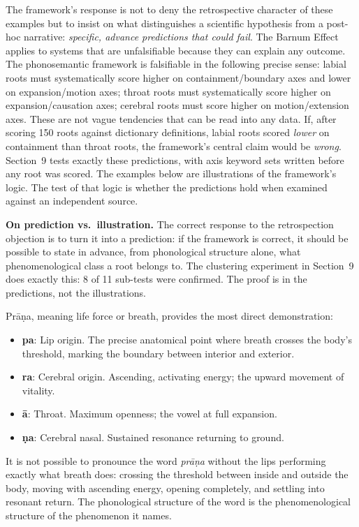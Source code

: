 \documentclass[12pt]{article}
\begin{document}
The framework's response is not to deny the retrospective character of these examples but to insist on what distinguishes a scientific hypothesis from a post-hoc narrative: \textit{specific, advance predictions that could fail}. The Barnum Effect applies to systems that are unfalsifiable because they can explain any outcome. The phonosemantic framework is falsifiable in the following precise sense: labial roots must systematically score higher on containment/boundary axes and lower on expansion/motion axes; throat roots must systematically score higher on expansion/causation axes; cerebral roots must score higher on motion/extension axes. These are not vague tendencies that can be read into any data. If, after scoring 150 roots against dictionary definitions, labial roots scored \textit{lower} on containment than throat roots, the framework's central claim would be \textit{wrong}. Section~9 tests exactly these predictions, with axis keyword sets written before any root was scored. The examples below are illustrations of the framework's logic. The test of that logic is whether the predictions hold when examined against an independent source.

\textbf{On prediction vs.~illustration.} The correct response to the retrospection objection is to turn it into a prediction: if the framework is correct, it should be possible to state in advance, from phonological structure alone, what phenomenological class a root belongs to. The clustering experiment in Section~9 does exactly this: 8 of 11 sub-tests were confirmed. The proof is in the predictions, not the illustrations.

Pr\={a}\d{n}a, meaning life force or breath, provides the most direct demonstration:

\begin{itemize}[leftmargin=2em]
  \item \textbf{pa}: Lip origin. The precise anatomical point where breath crosses the body's threshold, marking the boundary between interior and exterior.
  \item \textbf{ra}: Cerebral origin. Ascending, activating energy; the upward movement of vitality.
  \item \textbf{\={a}}: Throat. Maximum openness; the vowel at full expansion.
  \item \textbf{\d{n}a}: Cerebral nasal. Sustained resonance returning to ground.
\end{itemize}

It is not possible to pronounce the word \textit{pr\={a}\d{n}a} without the lips performing exactly what breath does: crossing the threshold between inside and outside the body, moving with ascending energy, opening completely, and settling into resonant return. The phonological structure of the word is the phenomenological structure of the phenomenon it names.
\end{document}
